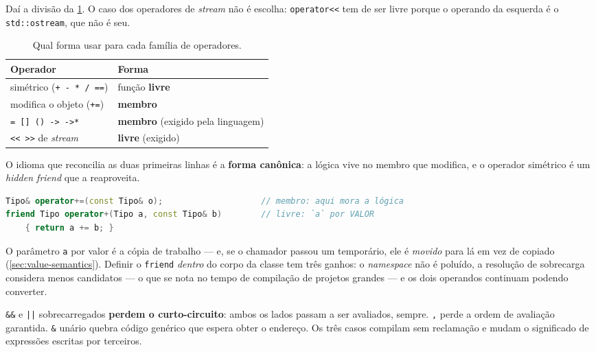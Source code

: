 Daí a divisão da \cref{tab:forma-operador}. O caso dos operadores de
\emph{stream} não é escolha: \texttt{operator<<} tem de ser livre porque o
operando da esquerda é o \texttt{std::ostream}, que não é seu.

\begin{table}[htbp]
\centering
\caption{Qual forma usar para cada família de operadores.}
\label{tab:forma-operador}
\footnotesize
\begin{tabular}{@{}ll@{}}
\toprule
\textbf{Operador} & \textbf{Forma} \\
\midrule
simétrico (\texttt{+ - * / ==})      & função \textbf{livre} \\
modifica o objeto (\texttt{+=})      & \textbf{membro} \\
\texttt{= [] () -> ->*}              & \textbf{membro} (exigido pela linguagem) \\
\texttt{<< >>} de \emph{stream}      & \textbf{livre} (exigido) \\
\bottomrule
\end{tabular}
\end{table}

O idioma que reconcilia as duas primeiras linhas é a \textbf{forma canônica}:
a lógica vive no membro que modifica, e o operador simétrico é um
\emph{hidden friend} que a reaproveita.

\begin{lstlisting}[style=bt, language=C++,
    caption={A forma canônica --- e o motivo de \texttt{a} vir por valor.}]
Tipo& operator+=(const Tipo& o);                    // membro: aqui mora a lógica
friend Tipo operator+(Tipo a, const Tipo& b)        // livre: `a` por VALOR
    { return a += b; }
\end{lstlisting}

O parâmetro \texttt{a} por valor é a cópia de trabalho --- e, se o chamador
passou um temporário, ele é \emph{movido} para lá em vez de copiado
(\cref{sec:value-semantics}). Definir o \texttt{friend} \emph{dentro} do corpo
da classe tem três ganhos: o \emph{namespace} não é poluído, a resolução de
sobrecarga considera menos candidatos --- o que se nota no tempo de compilação
de projetos grandes --- e os dois operandos continuam podendo converter.

\begin{armadilha}
\texttt{\&\&} e \texttt{||} sobrecarregados \textbf{perdem o curto-circuito}:
ambos os lados passam a ser avaliados, sempre. \texttt{,} perde a ordem de
avaliação garantida. \texttt{\&} unário quebra código genérico que espera obter
o endereço. Os três casos compilam sem reclamação e mudam o significado de
expressões escritas por terceiros.
\end{armadilha}

